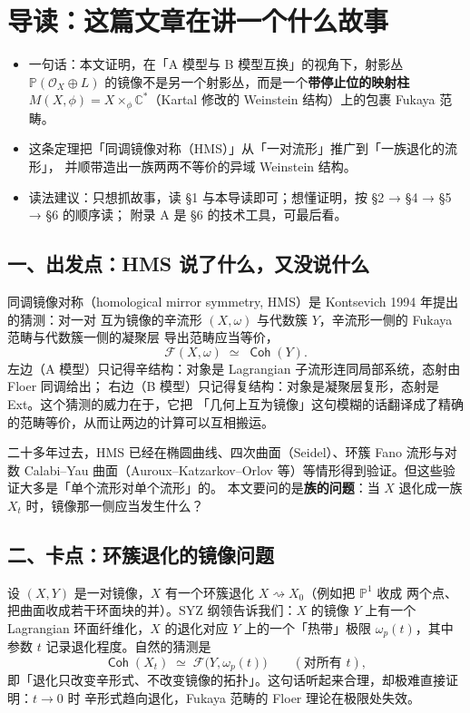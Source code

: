 \documentclass[11pt,a4paper]{article}
\DeclareMathOperator{\Coh}{\mathsf{Coh}}
\theoremstyle{cnth}
\newif\ifshowkey
\newenvironment{keytakeaways}{%
    \par\medskip
    \ifshowkey
        \begin{tcolorbox}[enhanced, breakable,
            colback=blue!3!white, colframe=blue!35!black,
            boxrule=0.5pt, arc=2pt, left=6pt, right=6pt, top=4pt, bottom=4pt,
            title={\small\textbf{本节重点}\quad{\footnotesize（译者所加）}},
            fonttitle=\bfseries, coltitle=black, colbacktitle=blue!10!white,
            toptitle=1pt, bottomtitle=1pt]
    \fi
    \begin{itemize}[leftmargin=1.4em,itemsep=0.15em,topsep=2pt]
}{%
    \end{itemize}%
    \ifshowkey
        \end{tcolorbox}%
    \fi
    \par\medskip
}
\begin{document}
\section*{导读：这篇文章在讲一个什么故事}

\begin{keytakeaways}
\item 一句话：本文证明，在「A 模型与 B 模型互换」的视角下，射影丛
      $\mathbb{P}(\mathcal{O}_X\oplus L)$ 的镜像不是另一个射影丛，而是一个\textbf{带停止位的映射柱}
      $M(X,\phi)=X\times_\phi\mathbb{C}^*$（Kartal 修改的 Weinstein 结构）上的包裹 Fukaya 范畴。
\item 这条定理把「同调镜像对称（HMS）」从「一对流形」推广到「一族退化的流形」，
      并顺带造出一族两两不等价的异域 Weinstein 结构。
\item 读法建议：只想抓故事，读 §1 与本导读即可；想懂证明，按 §2 → §4 → §5 → §6 的顺序读；
      附录 A 是 §6 的技术工具，可最后看。
\end{keytakeaways}

\subsection*{一、出发点：HMS 说了什么，又没说什么}

同调镜像对称（homological mirror symmetry, HMS）是 Kontsevich 1994 年提出的猜测：对一对
互为镜像的辛流形 $(X,\omega)$ 与代数簇 $Y$，辛流形一侧的 Fukaya 范畴与代数簇一侧的凝聚层
导出范畴应当等价，
\[
  \mathcal{F}(X,\omega)\;\simeq\;\Coh(Y).
\]
左边（A 模型）只记得辛结构：对象是 Lagrangian 子流形连同局部系统，态射由 Floer 同调给出；
右边（B 模型）只记得复结构：对象是凝聚层复形，态射是 Ext。这个猜测的威力在于，它把
「几何上互为镜像」这句模糊的话翻译成了精确的范畴等价，从而让两边的计算可以互相搬运。

二十多年过去，HMS 已经在椭圆曲线、四次曲面（Seidel）、环簇 Fano 流形与对数 Calabi–Yau
曲面（Auroux–Katzarkov–Orlov 等）等情形得到验证。但这些验证大多是「单个流形对单个流形」的。
本文要问的是\textbf{族的问题}：当 $X$ 退化成一族 $X_t$ 时，镜像那一侧应当发生什么？

\subsection*{二、卡点：环簇退化的镜像问题}

设 $(X,Y)$ 是一对镜像，$X$ 有一个环簇退化 $X\rightsquigarrow X_0$（例如把 $\mathbb{P}^1$ 收成
两个点、把曲面收成若干环面块的并）。SYZ 纲领告诉我们：$X$ 的镜像 $Y$ 上有一个
Lagrangian 环面纤维化，$X$ 的退化对应 $Y$ 上的一个「热带」极限 $\omega_p(t)$，其中参数 $t$
记录退化程度。自然的猜测是
\[
  \Coh(X_t)\;\simeq\;\mathcal{F}\bigl(Y,\omega_p(t)\bigr)\qquad(\text{对所有 }t),
\]
即「退化只改变辛形式、不改变镜像的拓扑」。这句话听起来合理，却极难直接证明：$t\to 0$ 时
辛形式趋向退化，Fukaya 范畴的 Floer 理论在极限处失效。
\end{document}
